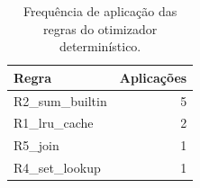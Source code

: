 \begin{table}[htbp]
\caption{Frequência de aplicação das regras do otimizador determinístico.}
\label{tab:regras}
\centering
\begin{tabular}{lr}
\hline
\textbf{Regra} & \textbf{Aplicações} \\
\hline
R2\_sum\_builtin & 5 \\
R1\_lru\_cache & 2 \\
R5\_join & 1 \\
R4\_set\_lookup & 1 \\
\hline
\end{tabular}
\end{table}
